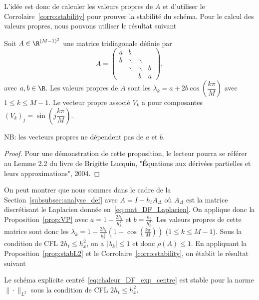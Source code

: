 \documentclass[12pt,a4paper,twoside]{article}
\begin{document}
L'id\'ee est donc de calculer les valeurs propres de $A$ et d'utiliser
le Corrolaire~\ref{corro:stability} pour prouver la stabilit\'e du sch\'ema.
Pour le calcul des valeurs propres, nous pouvons utiliser le r\'esultat suivant
\begin{proposition}
  \label{prop:VP}
  Soit $A \in \R^{(M-1)^2}$ une matrice tridiagonale d\'efinie par
  \begin{equation*}
    A =
    \begin{pmatrix}
      a & b &
      \\
      b & \ddots & \ddots
      \\
      & \ddots & \ddots & b
      \\
      & & b & a
    \end{pmatrix} ,
  \end{equation*}
  avec $a, b \in \R$. Les valeurs propres de $A$ sont les 
  $\lambda_k = a + 2b \cos \left( \dfrac{k \pi}{M} \right)$ avec $1 \leq k \leq M-1$.
  Le vecteur propre associ\'e $V_k$ a pour composantes 
  $(V_k)_j = \sin \left( j \dfrac{k \pi}{M} \right)$.

  NB: les vecteurs propres ne d\'ependent pas de $a$ et $b$.
\end{proposition}


\begin{proof}
  Pour une d\'emonstration de cette proposition, le lecteur pourra se r\'ef\'erer au 
  Lemme 2.2 du livre 
  de Brigitte Lucquin, "\'Equations aux d\'eriv\'ees partielles et leurs approximations", 2004.
\end{proof}


On peut montrer que nous sommes dans le cadre de la Section~\ref{subsubsec:analyse_def}
avec $A = I - h_t A_{\Delta}$ o\`u $A_{\Delta}$ est la matrice discr\'etisant le Laplacien
donn\'ee en~\eqref{eq:mat_DF_Laplacien}.
On applique donc la Proposition~\ref{prop:VP} avec $a = 1 - \frac{2h_t}{h_x^2}$
et $b = \frac{h_t}{h_x^2}$.
Les valeurs propres de cette matrice sont donc les
$\lambda_k = 1 - \frac{2h_t}{h_x^2}(1-\cos(\frac{k \pi}{M}))$ ($1 \leq k \leq M-1$).
Sous la condition de CFL $2h_t \leq h_x^2$, on a $| \lambda_k | \leq 1$ et donc
$\rho(A) \leq 1$.
En appliquant la Proposition~\ref{prop:stabL2} et le Corrolaire~\ref{corro:stability}, on
\'etablit le r\'esultat suivant
\begin{proposition}
  Le sch\'ema explicite centr\'e~\eqref{eq:chaleur_DF_exp_centre}
  est stable pour la norme $\| \cdot \|_{L^2}$ sous la condition de CFL $2 h_t \leq h_x^2$.
\end{proposition}
\end{document}
